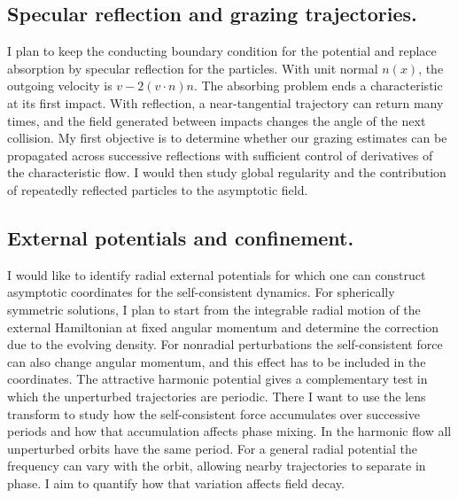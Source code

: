 \documentclass[reqno,10pt,letterpaper]{amsart}
\numberwithin{equation}{section}
\begin{document}
\subsection{Specular reflection and grazing trajectories.}
I plan to keep the conducting boundary condition for the potential and replace absorption by specular reflection for the particles. With unit normal $n(x)$, the outgoing velocity is $v-2(v\cdot n)n$. The absorbing problem ends a characteristic at its first impact. With reflection, a near-tangential trajectory can return many times, and the field generated between impacts changes the angle of the next collision. My first objective is to determine whether our grazing estimates can be propagated across successive reflections with sufficient control of derivatives of the characteristic flow. I would then study global regularity and the contribution of repeatedly reflected particles to the asymptotic field.

\subsection{External potentials and confinement.}
I would like to identify radial external potentials for which one can construct asymptotic coordinates for the self-consistent dynamics. For spherically symmetric solutions, I plan to start from the integrable radial motion of the external Hamiltonian at fixed angular momentum and determine the correction due to the evolving density. For nonradial perturbations the self-consistent force can also change angular momentum, and this effect has to be included in the coordinates. The attractive harmonic potential gives a complementary test in which the unperturbed trajectories are periodic. There I want to use the lens transform to study how the self-consistent force accumulates over successive periods and how that accumulation affects phase mixing. In the harmonic flow all unperturbed orbits have the same period. For a general radial potential the frequency can vary with the orbit, allowing nearby trajectories to separate in phase. I aim to quantify how that variation affects field decay.
\end{document}
